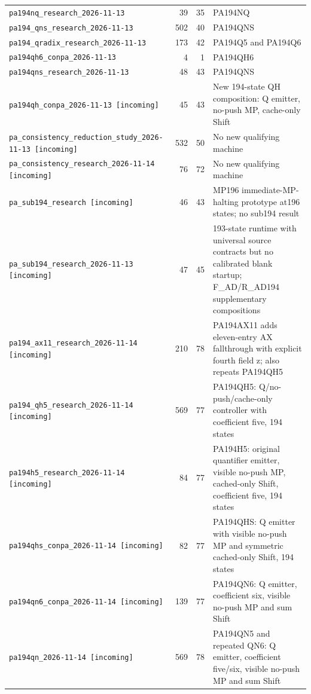 \begin{longtable}{@{}p{.39\linewidth}rrp{.43\linewidth}@{}}
\nolinkurl{pa194nq_research_2026-11-13} & 39 & 35 & PA194NQ \\
\nolinkurl{pa194_qns_research_2026-11-13} & 502 & 40 & PA194QNS \\
\nolinkurl{pa194_qradix_research_2026-11-13} & 173 & 42 & PA194Q5 and PA194Q6 \\
\nolinkurl{pa194qh6_conpa_2026-11-13} & 4 & 1 & PA194QH6 \\
\nolinkurl{pa194qns_research_2026-11-13} & 48 & 43 & PA194QNS \\
\nolinkurl{pa194qh_conpa_2026-11-13 [incoming]} & 45 & 43 & New 194-state QH composition: Q emitter, no-push MP, cache-only Shift \\
\nolinkurl{pa_consistency_reduction_study_2026-11-13 [incoming]} & 532 & 50 & No new qualifying machine \\
\nolinkurl{pa_consistency_research_2026-11-14 [incoming]} & 76 & 72 & No new qualifying machine \\
\nolinkurl{pa_sub194_research [incoming]} & 46 & 43 & MP196 immediate-MP-halting prototype at196 states; no sub194 result \\
\nolinkurl{pa_sub194_research_2026-11-13 [incoming]} & 47 & 45 & 193-state runtime with universal source contracts but no calibrated blank startup; F\_AD/R\_AD194 supplementary compositions \\
\nolinkurl{pa194_ax11_research_2026-11-14 [incoming]} & 210 & 78 & PA194AX11 adds eleven-entry AX fallthrough with explicit fourth field z; also repeats PA194QH5 \\
\nolinkurl{pa194_qh5_research_2026-11-14 [incoming]} & 569 & 77 & PA194QH5: Q/no-push/cache-only controller with coefficient five, 194 states \\
\nolinkurl{pa194h5_research_2026-11-14 [incoming]} & 84 & 77 & PA194H5: original quantifier emitter, visible no-push MP, cached-only Shift, coefficient five, 194 states \\
\nolinkurl{pa194qhs_conpa_2026-11-14 [incoming]} & 82 & 77 & PA194QHS: Q emitter with visible no-push MP and symmetric cached-only Shift, 194 states \\
\nolinkurl{pa194qn6_conpa_2026-11-14 [incoming]} & 139 & 77 & PA194QN6: Q emitter, coefficient six, visible no-push MP and sum Shift \\
\nolinkurl{pa194qn_2026-11-14 [incoming]} & 569 & 78 & PA194QN5 and repeated QN6: Q emitter, coefficient five/six, visible no-push MP and sum Shift \\
\end{longtable}\endgroup
